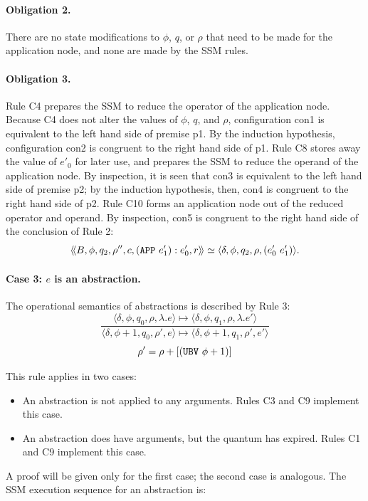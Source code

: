 \paragraph{Obligation 2.} There are no state modifications to \(\phi\), \(q\),
or \(\rho\) that need to be made for the application node, and none are made by
the SSM rules.

\paragraph{Obligation 3.} Rule C4 prepares the SSM to reduce the operator of
the application node. Because C4 does not alter the values of \(\phi\), \(q\),
and \(\rho\), configuration con1 is equivalent to the left hand side of premise
p1. By the induction hypothesis, configuration con2 is congruent to the right
hand side of p1. Rule C8 stores away the value of \(e'_0\) for later use, and
prepares the SSM to reduce the operand of the application node. By inspection,
it is seen that con3 is equivalent to the left hand side of premise p2; by the
induction hypothesis, then, con4 is congruent to the right hand side of p2.
Rule C10 forms an application node out of the reduced operator and operand. By
inspection, con5 is congruent to the right hand side of the conclusion of Rule
2:
\[
\langle\!\langle B,\phi,q_2,\rho'',c,(\texttt{APP}\ e'_1):e'_0,r\rangle\!\rangle
\simeq
\langle \delta,\phi,q_2,\rho,(e'_0\ e'_1)\rangle.
\]

\paragraph{Case 3: \(e\) is an abstraction.}
The operational semantics of abstractions is described by Rule 3:
\[
\frac{
  \langle \delta,\phi,q_0,\rho,\lambda.e\rangle
  \longmapsto
  \langle \delta,\phi,q_1,\rho,\lambda.e'\rangle
}{
  \langle \delta,\phi+1,q_0,\rho',e\rangle
  \longmapsto
  \langle \delta,\phi+1,q_1,\rho',e'\rangle
}
\]
\[
\rho'=\rho+[(\texttt{UBV}\ \phi+1)]
\]

This rule applies in two cases:
\begin{itemize}
\item An abstraction is not applied to any arguments. Rules C3 and C9 implement
this case.
\item An abstraction does have arguments, but the quantum has expired. Rules C1
and C9 implement this case.
\end{itemize}

A proof will be given only for the first case; the second case is analogous.
The SSM execution sequence for an abstraction is:

